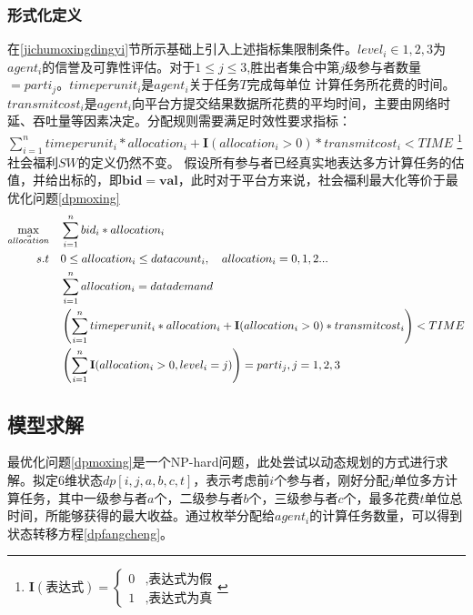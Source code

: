 \documentclass[promaster]{thesis-uestc}
\begin{document}
\subsubsection{形式化定义}
\label{dpdingyi}
在\ref{jichumoxingdingyi}节所示基础上引入上述指标集限制条件。$level_i\in {1,2,3}$为$agent_i$的信誉及可靠性评估。对于$1\leq j \leq 3$,胜出者集合中第$j$级参与者数量$=parti_j$。$timeperunit_i$是$agent_i$关于$任务T$完成每单位
计算任务所花费的时间。$transmitcost_i$是$agent_i$向平台方提交结果数据所花费的平均时间，主要由网络时延、吞吐量等因素决定。分配规则需要满足时效性要求指标：$\sum_{i=1}^{n}{timeperunit_i*allocation_i+\mathbf{I}(allocation_i > 0)*transmitcost_i} < TIME$
\footnote{$\mathbf{I}(\text{表达式}) = \begin{cases}{}
        0&,\text{表达式为假}\\
        1&,\text{表达式为真}
        \end{cases}$
}%
社会福利$SW$的定义仍然不变。
假设所有参与者已经真实地表达多方计算任务的估值，并给出标的，即$\mathbf{bid} = \mathbf{val}$，此时对于平台方来说，社会福利最大化等价于最优化问题\ref{dpmoxing}
\begin{align}
    \label{dpmoxing}\max_{\vec{allocation}} \quad&\sum_{i=1}^{n}{bid_i*allocation_i}\\
    s.t\quad& 0\leq allocation_i\leq datacount_i,\quad allocation_i = {0,1,2...}\notag\\
        \quad& \sum_{i=1}^{n}{allocation_i} = datademand\notag\\
        \quad& \left(\sum_{i=1}^{n}{timeperunit_i*allocation_i+\mathbf{I}(allocation_i > 0)*transmitcost_i}\right) < TIME\notag\\
        \quad& \left(\sum_{i=1}^{n}{\mathbf{I}(allocation_i > 0,level_i = j)}\right)=parti_j, j = {1,2,3}\notag
\end{align}

\subsection{模型求解}
最优化问题\ref{dpmoxing}是一个NP-hard问题，此处尝试以动态规划的方式进行求解。拟定6维状态$dp[i,j,a,b,c,t]$，表示考虑前$i$个参与者，刚好分配$j$单位多方计算任务，其中一级参与者$a$个，二级参与者$b$个，三级参与者$c$个，最多花费$t$单位总时间，所能够获得的最大收益。通过枚举分配给$agent_i$的计算任务数量，可以得到状态转移方程\ref{dpfangcheng}。
\end{document}
